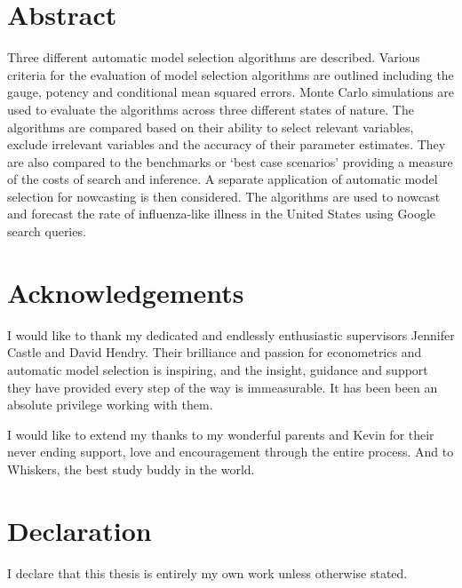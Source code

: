 \documentclass[a4paper]{report}
\begin{document}



\mbox{}
\thispagestyle{empty}
\newpage


\chapter*{\centering Abstract}
Three different automatic model selection algorithms are described. Various criteria for the evaluation of model selection algorithms are outlined including the gauge, potency and conditional mean squared errors. Monte Carlo simulations are used to evaluate the algorithms across three different states of nature.  The algorithms are compared based on their ability to select relevant variables, exclude irrelevant variables and the accuracy of their parameter estimates. They are also compared to the benchmarks or `best case scenarios' providing a measure of the costs of search and inference. A separate application of automatic model selection for nowcasting is then considered. The algorithms are used to nowcast and forecast the rate of influenza-like illness in the United States using Google search queries. 

\newpage
\thispagestyle{empty}
\mbox{}

\chapter*{\centering Acknowledgements}

I would like to thank my dedicated and endlessly enthusiastic supervisors Jennifer Castle and David Hendry. Their brilliance and passion for econometrics and automatic model selection is inspiring, and the insight, guidance and support they have provided every step of the way is immeasurable. It has been been an absolute privilege working with them.

I would like to extend my thanks to my wonderful parents and Kevin for their never ending support, love and encouragement through the entire process. And to Whiskers, the best study buddy in the world. 

\newpage
\thispagestyle{empty}
\mbox{}


\chapter*{\centering Declaration}
\centerline{I declare that this thesis is entirely my own work unless otherwise stated.}
\newpage
\thispagestyle{empty}
\mbox{}
\end{document}
